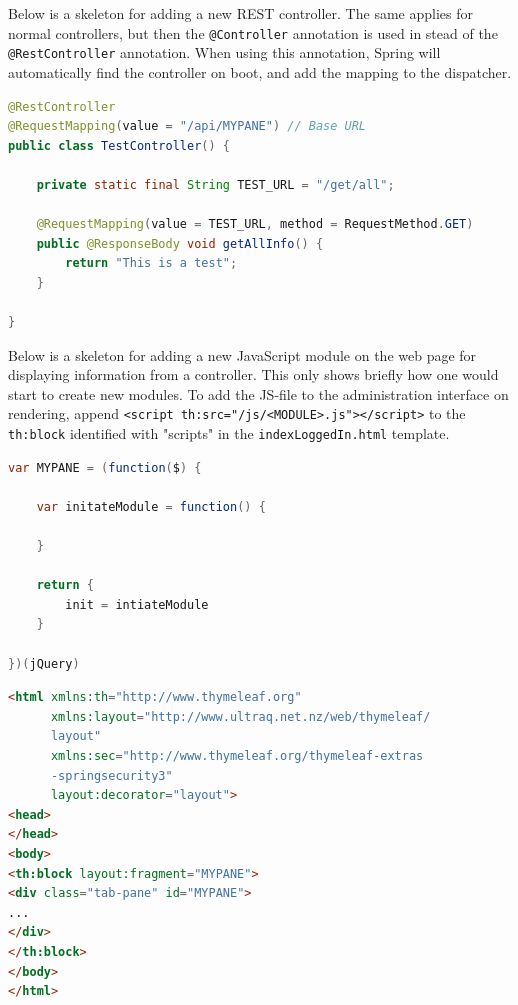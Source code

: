 Below is a skeleton for adding a new REST controller. The same applies for normal controllers, but then the \verb!@Controller! annotation is used in stead of the \verb!@RestController! annotation. When using this annotation, Spring will automatically find the controller on boot, and add the mapping to the dispatcher. 

\begin{lstlisting}[language=Java, captionpos=b, caption=Skeleton for a REST-controller, frame=bt, showstringspaces=false]
@RestController
@RequestMapping(value = "/api/MYPANE") // Base URL
public class TestController() {
    
    private static final String TEST_URL = "/get/all";
    
    @RequestMapping(value = TEST_URL, method = RequestMethod.GET)
    public @ResponseBody void getAllInfo() {
        return "This is a test";
    }
    
}
\end{lstlisting}

Below is a skeleton for adding a new JavaScript module on the web page for displaying information from a controller. This only shows briefly how one would start to create new modules. To add the JS-file to the administration interface on rendering, append \verb!<script th:src="/js/<MODULE>.js"></script>! to the \verb!th:block! identified with "scripts" in the \verb!indexLoggedIn.html! template. \\ 

\begin{lstlisting}[language=Java, captionpos=b, caption=Skeleton for a JavaScript module, frame=bt, showstringspaces=false]
var MYPANE = (function($) { 

    var initateModule = function() {
    
    }

    return {
        init = intiateModule
    }

})(jQuery)
\end{lstlisting}

\begin{lstlisting}[language=HTML, captionpos=b, caption=Skeleton for a Thymeleaf-template, frame=bt, showstringspaces=false]
<html xmlns:th="http://www.thymeleaf.org"
      xmlns:layout="http://www.ultraq.net.nz/web/thymeleaf/
      layout"
      xmlns:sec="http://www.thymeleaf.org/thymeleaf-extras
      -springsecurity3"
      layout:decorator="layout">
<head>
</head>
<body>
<th:block layout:fragment="MYPANE">
<div class="tab-pane" id="MYPANE">
...
</div>
</th:block>
</body>
</html>
\end{lstlisting}

